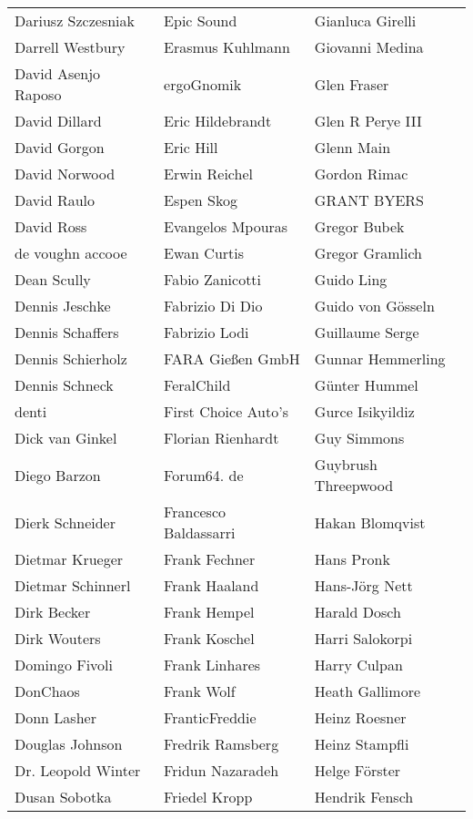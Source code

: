 \begin{tabular}{p{4.5cm}p{4.5cm}p{4.5cm}}
Dariusz Szczesniak & Epic Sound & Gianluca Girelli \\
Darrell Westbury & Erasmus Kuhlmann & Giovanni Medina \\
David Asenjo Raposo & ergoGnomik & Glen Fraser \\
David Dillard & Eric Hildebrandt & Glen R Perye III \\
David Gorgon & Eric Hill & Glenn Main \\
David Norwood & Erwin Reichel & Gordon Rimac \\
David Raulo & Espen Skog & GRANT BYERS \\
David Ross & Evangelos Mpouras & Gregor Bubek \\
de voughn accooe & Ewan Curtis & Gregor Gramlich \\
Dean Scully & Fabio Zanicotti & Guido Ling \\
Dennis Jeschke & Fabrizio Di Dio & Guido von Gösseln \\
Dennis Schaffers & Fabrizio Lodi & Guillaume Serge \\
Dennis Schierholz & FARA Gießen GmbH & Gunnar Hemmerling \\
Dennis Schneck & FeralChild & Günter Hummel \\
denti & First Choice Auto's & Gurce Isikyildiz \\
Dick van Ginkel & Florian Rienhardt & Guy Simmons \\
Diego Barzon & Forum64. de & Guybrush Threepwood \\
Dierk Schneider & Francesco Baldassarri & Hakan Blomqvist \\
Dietmar Krueger & Frank Fechner & Hans Pronk \\
Dietmar Schinnerl & Frank Haaland & Hans-Jörg Nett \\
Dirk Becker & Frank Hempel & Harald Dosch \\
Dirk Wouters & Frank Koschel & Harri Salokorpi \\
Domingo Fivoli & Frank Linhares & Harry Culpan \\
DonChaos & Frank Wolf & Heath Gallimore \\
Donn Lasher & FranticFreddie & Heinz Roesner \\
Douglas Johnson & Fredrik Ramsberg & Heinz Stampfli \\
Dr. Leopold Winter & Fridun Nazaradeh & Helge Förster \\
Dusan Sobotka & Friedel Kropp & Hendrik Fensch \\

\end{tabular}
